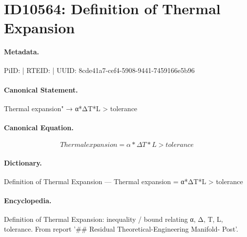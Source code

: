 \section*{ID10564: Definition of Thermal Expansion}
\paragraph{Metadata.}
PiID:  | RTEID:  | UUID: 8cde41a7-cef4-5908-9441-7459166e5b96

\paragraph{Canonical Statement.}
Thermal expansion" → α*ΔT*L > tolerance

\paragraph{Canonical Equation.}
\[
Thermal expansion = α*ΔT*L > tolerance
\]

\paragraph{Dictionary.}
Definition of Thermal Expansion — Thermal expansion = α*ΔT*L > tolerance

\paragraph{Encyclopedia.}
Definition of Thermal Expansion: inequality / bound relating α, Δ, T, L, tolerance. From report '\#\# Residual Theoretical-Engineering Manifold- Post'.
